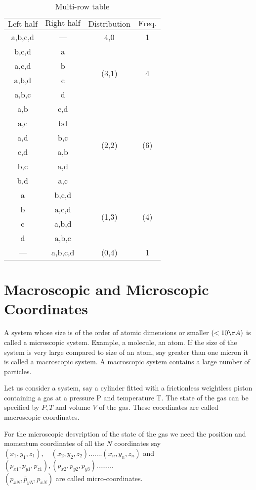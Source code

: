 	\begin{table}[ht]
	\caption{Multi-row table}
	\begin{center}
		\begin{tabular}{|c|c|c|c|}
			\hline
			$\text{Left half}$&$\text{Right half}$&$\text{Distribution}$&$\text{Freq.}$\\\hline
			a,b,c,d&---&4,0&1\\\hline
			b,c,d&a&\multirow{4}{*}{(3,1)}&\multirow{4}{*}{4}\\\cline{1-2}
			a,c,d&b & &\\\cline{1-2}
			a,b,d&c& &\\\cline{1-2}
			a,b,c&d& &\\\cline{1-2}\hline
			a,b&c,d&\multirow{6}{*}{(2,2)}&\multirow{6}{*}{(6)}\\\cline{1-2}
			a,c&bd& & \\\cline{1-2}
			a,d& b,c& & \\\cline{1-2}
			c,d&a,b& & \\\cline{1-2}
			b,c& a,d& & \\\cline{1-2}
			b,d&a,c& & \\\cline{1-2}\hline
			a&b,c,d&\multirow{4}{*}{(1,3)}&\multirow{4}{*}{(4)}\\\cline{1-2} 
			b&a,c,d& & \\\cline{1-2}
			c&a,b,d & &\\\cline{1-2}
			d&a,b,c & &\\\hline
			---&a,b,c,d &(0,4) &1 \\\hline
		\end{tabular}
	\end{center}
	\label{tab:multicol}
\end{table}
\section{Macroscopic and Microscopic Coordinates}
A system whose size is of the order of atomic dimensions or smaller $(<10 \AA)$ is called a microscopic system. Example, a molecule, an atom. If the size of the system is very large compared to size of an atom, say greater than one micron it is called a macroscopic system. A macroscopic system contains a large number of particles.\\
\par Let us consider a system, say a cylinder fitted with a frictionless weightless piston containing a gas at a pressure $\mathrm{P}$ and temperature $\mathrm{T}$. The state of the gas can be specified by $P, T$ and volume $V$ of the gas. These coordinates are called macroscopic coordinates.\\
\par For the microscopic desvription of the state of the gas we need the position and momentum coordinates of all the $N$ coordinates say $\left(x_{1}, y_{1}, z_{1}\right), \quad\left(x_{2}, y_{2}, z_{2}\right) \ldots \ldots .\left(x_{n}, y_{n}, z_{n}\right)$ and $\left(p_{x 1}, p_{y 1}, p_{z 1}\right),\left(p_{x 2}, p_{y 2}, p_{y 3}\right) \ldots \ldots \ldots$\\$\left(p_{x N}, \bar{p}_{y N}, p_{x N}\right)$ are called micro-coordinates.
